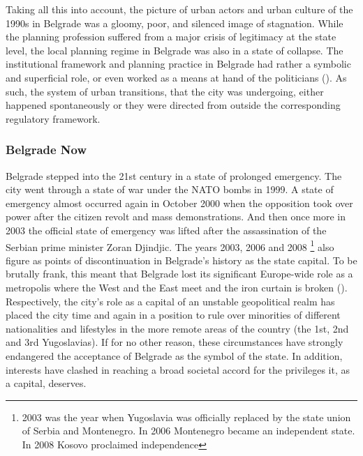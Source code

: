 \documentclass[11pt]{report}
\begin{document}
{{{{Taking all this into account, the picture of urban actors and urban culture of the 1990s in Belgrade was a gloomy, poor, and silenced image of stagnation. While the planning profession suffered from a major crisis of legitimacy at the state level, the local planning regime in Belgrade was also in a state of collapse. The institutional framework and planning practice in Belgrade had rather a symbolic and superficial role, or even worked as a means at hand of the politicians (\href{Vujosevic}{\citealt{vujosevic_planning_2006}}). As such, the system of urban transitions, that the city was undergoing, either happened spontaneously or they were directed from outside the corresponding regulatory framework.

\subsubsection{Belgrade Now}
Belgrade stepped into the 21st century in a state of prolonged emergency. The city went through a state of war under the NATO bombs in 1999. A state of emergency almost occurred again in October 2000 when the opposition took over power after the citizen revolt and mass demonstrations. And then once more in 2003 the official state of emergency was lifted after the assassination of the Serbian prime minister Zoran Djindjic. The years 2003, 2006 and 2008
\footnote{2003 was the year when Yugoslavia was officially replaced by the state union of Serbia and Montenegro. In 2006 Montenegro became an independent state. In 2008 Kosovo proclaimed independence}
also figure as points of discontinuation in Belgrade’s history as the state capital. To be brutally frank, this meant that Belgrade lost its significant Europe-wide role as a metropolis where the West and the East meet and the iron curtain is broken  (\href{Grozdanic}{\citealt{grozdanic_belgrade_2008}}).
\\

Respectively, the city’s role as a capital of an unstable geopolitical realm has placed the city time and again in a position to rule over minorities of different nationalities and lifestyles in the more remote areas of the country (the 1st, 2nd and 3rd Yugoslavias). If for no other reason, these circumstances have strongly endangered the acceptance of Belgrade as the symbol of the state. In addition, interests have clashed in reaching a broad societal accord for the privileges it, as a capital, deserves.
\\

}}}}
\end{document}
